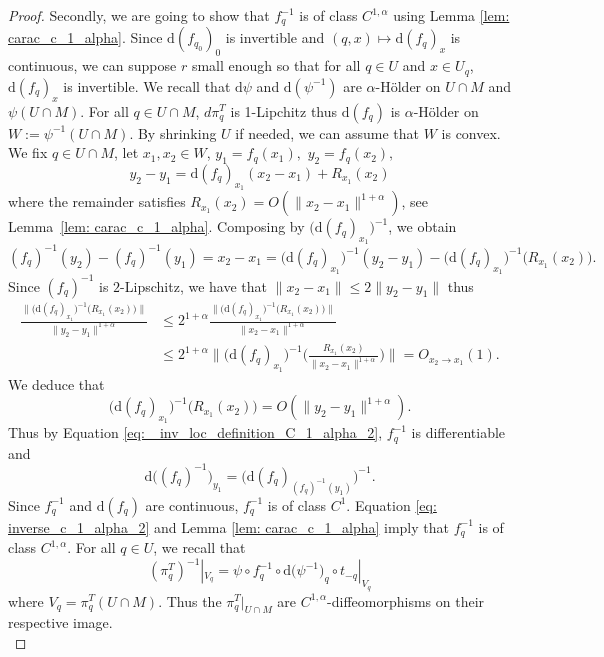 \documentclass[10pt,a4paper]{amsart}
\renewcommand{\d}{\mathrm{d}}
\renewcommand{\leq}{\leqslant}
\begin{document}
\begin{proof}
    \noindent Secondly, we are going to show that $f_q^{-1}$ is of class $C^{1,\alpha}$ using Lemma \ref{lem: carac_c_1_alpha}.
    Since $\d (f_{q_0})_0$ is invertible and $(q,x) \mapsto \d (f_q)_x$ is continuous, we can suppose $r$ small enough so that for all $q \in U$ and $x \in U_q$, $\d (f_q)_x$ is invertible.
    We recall that  $\d \psi$ and $\d (\psi^{-1})$ are $\alpha$-Hölder on $U \cap M$ and $\psi(U \cap M)$.
    For all $q \in U \cap M$, $d \pi_q^T$ is 1-Lipchitz thus $\d (f_{q})$ is $\alpha$-Hölder on $W :=\psi^{-1}(U \cap M)$.
    By shrinking $U$ if needed, we can assume that $W$ is convex. 
    We fix $q \in U\cap M$, let $x_1,x_2\in W$, $y_1=f_q(x_1),$ $y_2=f_q(x_2),$ 
    $$ y_2 - y_1 = \d (f_q)_{x_1}(x_2-x_1) + R_{x_1}(x_2)$$
    where the remainder satisfies $R_{x_1}(x_2) = O(\|x_2-x_1\|^{1+\alpha})$, see Lemma~\ref{lem: carac_c_1_alpha}. 
    Composing by $\big(\d (f_q)_{x_1}\big)^{-1}$, we obtain
    \begin{equation} \label{eq: _inv_loc_definition_C_1_alpha_2}
        (f_q)^{-1}(y_2) -  (f_q)^{-1}(y_1) = x_2-x_1 = \big(\d (f_q)_{x_1}\big)^{-1}(y_2 - y_1) - \big(\d (f_q)_{x_1}\big)^{-1}\big(R_{x_1}(x_2)\big).
    \end{equation}
    Since $(f_q)^{-1}$ is $2$-Lipschitz, we have that $\|x_2-x_1\| \leq 2 \|y_2-y_1\|$ thus
    \begin{align*}
        \frac{\| \big(\d (f_q)_{x_1}\big)^{-1}\big(R_{x_1}(x_2)\big) \|}{\|y_2-y_1\|^{1+\alpha}} &\leq 2^{1+\alpha} \frac{\| \big(\d (f_q)_{x_1}\big)^{-1}\big(R_{x_1}(x_2)\big) \|}{\|x_2-x_1\|^{1+\alpha}} \\ 
        &\leq 2^{1+\alpha} \bigg\| \big(\d (f_q)_{x_1}\big)^{-1}\bigg( \frac{R_{x_1}(x_2)}{\|x_2-x_1\|^{1+\alpha}} \bigg) \bigg\| = O_{x_2\to x_1}(1).
    \end{align*}
    We deduce that 
    \begin{equation} \label{eq: inverse_c_1_alpha_2}
        \big(\d (f_q)_{x_1}\big)^{-1}\big(R_{x_1}(x_2)\big) = O(\|y_2-y_1\|^{1+\alpha}).
    \end{equation}
    Thus by Equation \eqref{eq: _inv_loc_definition_C_1_alpha_2}, $f_q^{-1}$ is differentiable and 
    $$\d \big( (f_q)^{-1} \big)_{y_1} = \big(\d (f_q)_{(f_q)^{-1}(y_1)} \big)^{-1}.$$
    Since $f_q^{-1}$ and $\d (f_q)$ are continuous, $f_q^{-1}$ is of class $C^1$. Equation \eqref{eq: inverse_c_1_alpha_2} and Lemma \ref{lem: carac_c_1_alpha} imply that  $f_q^{-1}$ is of class $C^{1,\alpha}$.
    For all $q \in U$, we recall that
    $$(\pi_{q}^T)^{-1} |_{V_q} = \psi \circ f_{q}^{-1} \circ \d \big(\psi^{-1}\big) _q \circ t_{-q} |_{V_q} $$
    where $V_q = \pi_{q}^T (U \cap M)$.
    Thus the $\pi_{q}^T |_{U \cap M}$ are $C^{1,\alpha}$-diffeomorphisms on their respective image.\\
    

\end{proof}
\end{document}

